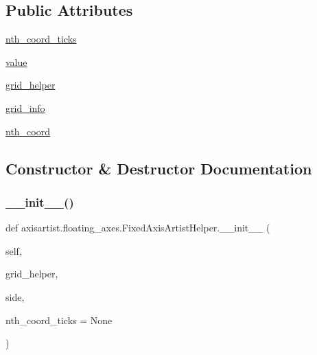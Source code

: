 \subsection*{Public Attributes}
\begin{DoxyCompactItemize}
\item 
\hyperlink{classaxisartist_1_1floating__axes_1_1FixedAxisArtistHelper_ae39bd32ff5e59deb0ff93c46c57c5e21}{nth\+\_\+coord\+\_\+ticks}
\item 
\hyperlink{classaxisartist_1_1floating__axes_1_1FixedAxisArtistHelper_a403e932f22ce43c4ba23d397d3148b89}{value}
\item 
\hyperlink{classaxisartist_1_1floating__axes_1_1FixedAxisArtistHelper_afd8544d21a58281815be582f0923fe4c}{grid\+\_\+helper}
\item 
\hyperlink{classaxisartist_1_1floating__axes_1_1FixedAxisArtistHelper_af68541af6b4f2f701ca8a4431d52555c}{grid\+\_\+info}
\item 
\hyperlink{classaxisartist_1_1floating__axes_1_1FixedAxisArtistHelper_a18abf7fac68c14cfefa1f287a1e56d73}{nth\+\_\+coord}
\end{DoxyCompactItemize}


\subsection{Constructor \& Destructor Documentation}
\mbox{\label{classaxisartist_1_1floating__axes_1_1FixedAxisArtistHelper_af9139dd0ba4c9dcf9e976388f983574a}} 
\subsubsection{\texorpdfstring{\+\_\+\+\_\+init\+\_\+\+\_\+()}{\_\_init\_\_()}}
{\footnotesize\ttfamily def axisartist.\+floating\+\_\+axes.\+Fixed\+Axis\+Artist\+Helper.\+\_\+\+\_\+init\+\_\+\+\_\+ (\begin{DoxyParamCaption}\item[{}]{self,  }\item[{}]{grid\+\_\+helper,  }\item[{}]{side,  }\item[{}]{nth\+\_\+coord\+\_\+ticks = {\ttfamily None} }\end{DoxyParamCaption})}

